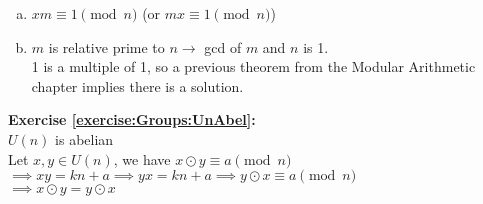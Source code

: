 \begin{enumerate}[(a)]
\item
$xm\equiv 1 \pmod{n}$ (or $mx\equiv 1 \pmod{n}$)

\item 
$m$ is relative prime to $n\to$ gcd of $m$ and $n$ is 1.\\
1 is a multiple of 1, so a previous theorem from the Modular Arithmetic chapter implies  there is a solution.
\end{enumerate}

\noindent\textbf{Exercise \ref{exercise:Groups:UnAbel}:}
\\
$U(n)$ is abelian\\
Let $x, y \in U(n)$, we have $x \odot y \equiv a \pmod{n}$\\
$\implies xy=kn + a \implies yx = kn + a \implies y \odot x \equiv a \pmod{n}$\\
$\implies x \odot y = y \odot x$
\\

